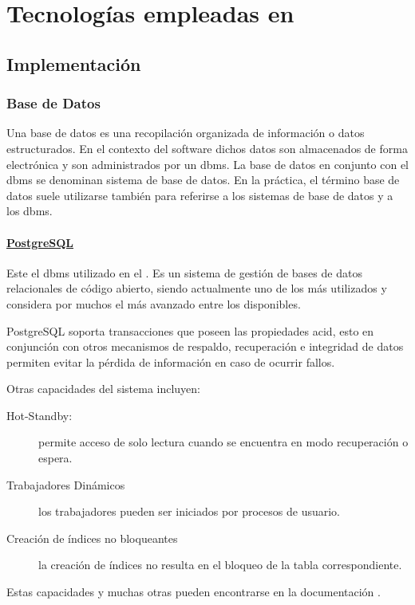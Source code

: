 \section{Tecnologías empleadas en \SIOSU}


\subsection{Implementación}

\subsubsection{Base de Datos}
Una base de datos es una recopilación organizada de información o datos
estructurados. En el contexto del software dichos datos son almacenados de forma electrónica y son administrados por un \acrfull{dbms}. La base de datos en conjunto con el \acrshort{dbms} se denominan sistema de base de datos. En la práctica, el término base de datos suele utilizarse también para referirse a los sistemas de base de datos y a los \acrshort{dbms}.

\paragraph{\href{https://www.postgresql.org/}{PostgreSQL}}
Este el \acrshort{dbms} utilizado en el \SIOSU. Es un sistema de gestión de bases de datos relacionales de código abierto, siendo actualmente uno de los más utilizados y considera por muchos el más avanzado entre los disponibles.

PostgreSQL soporta transacciones que poseen las propiedades \acrfull{acid}, esto en conjunción con otros mecanismos de respaldo, recuperación e integridad de datos permiten evitar la pérdida de información en caso de ocurrir fallos.

Otras capacidades del sistema incluyen:
\begin{description}
    \item[Hot-Standby:] permite acceso de solo lectura cuando se encuentra en modo recuperación o espera.
    \item[Trabajadores Dinámicos] los trabajadores pueden ser iniciados por procesos de usuario.
    \item[Creación de índices no bloqueantes] la creación de índices no resulta en el bloqueo de la tabla correspondiente.
\end{description}
Estas capacidades y muchas otras pueden encontrarse en la documentación \cite{postgreFeatures}.

